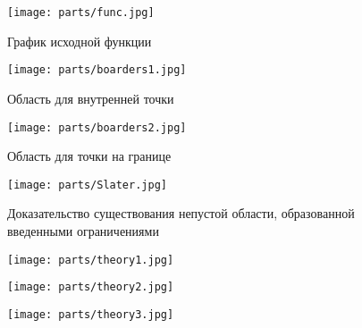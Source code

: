 \documentclass[../body.tex]{subfiles}
\begin{document}
\begin{figure}[H]
    \centering
    \texttt{[image: parts/func.jpg]}
    \caption{График исходной функции}
\end{figure}
\begin{figure}[H]
    \centering
    \texttt{[image: parts/boarders1.jpg]}
    \caption{Область для внутренней точки}
\end{figure}
\begin{figure}[H]
    \centering
    \texttt{[image: parts/boarders2.jpg]}
    \caption{Область для точки на границе}
\end{figure}
\begin{figure}[H]
    \centering
    \texttt{[image: parts/Slater.jpg]}
    \caption{Доказательство существования непустой области, образованной введенными ограничениями}
\end{figure}
\begin{figure}[H]
    \centering
    \texttt{[image: parts/theory1.jpg]}
\end{figure}
\begin{figure}[H]
    \centering
    \texttt{[image: parts/theory2.jpg]}
\end{figure}
\begin{figure}[H]
    \centering
    \texttt{[image: parts/theory3.jpg]}
\end{figure}
\end{document}

